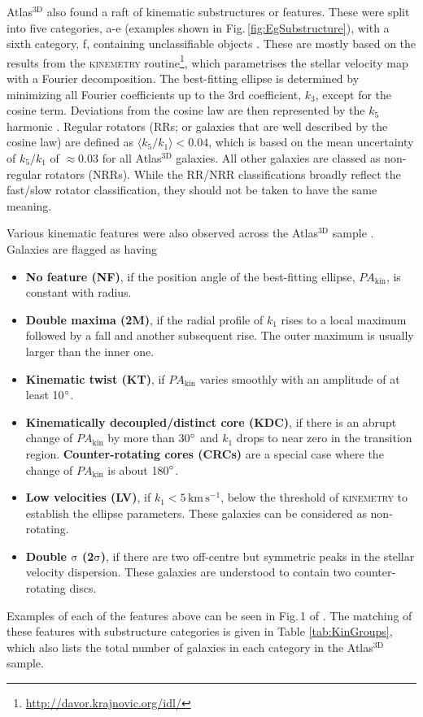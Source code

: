 	Atlas$^\text{3D}$ also found a raft of kinematic substructures or features. These were split into five categories, a-e (examples shown in Fig.\,\ref{fig:EgSubstructure}), with a sixth category, f, containing unclassifiable objects \citep{Krajnovic2011}. These are mostly based on the results from the \textsc{kinemetry} routine\footnote{\url{http://davor.krajnovic.org/idl/}}\citep{Krajnovic2006}, which parametrises the stellar velocity map with a Fourier decomposition. The best-fitting ellipse is determined by minimizing all Fourier coefficients up to the 3rd coefficient, $k_3$, except for the cosine term. Deviations from the cosine law are then represented by the $k_5$ harmonic \citep{Krajnovic2006}. Regular rotators (RRs; or galaxies that are well described by the cosine law) are defined as $\langle k_5/k_1 \rangle < 0.04$, which is based on the mean uncertainty of $k_5/k_1$ of $\approx 0.03$ for all Atlas$^\text{3D}$ galaxies. All other galaxies are classed as non-regular rotators (NRRs). While the RR/NRR classifications broadly reflect the fast/slow rotator classification, they should not be taken to have the same meaning. 

	Various kinematic features were also observed across the Atlas$^\text{3D}$ sample \citep{Krajnovic2011}. Galaxies are flagged as having
	\begin{itemize}
		\item \textbf{No feature (NF)}, if the position angle of the best-fitting ellipse, $PA_\mathrm{kin}$, is constant with radius.
		\item \textbf{Double maxima (2M)}, if the radial profile of $k_1$ rises to a local maximum followed by a fall and another subsequent rise. The outer maximum is usually larger than the inner one. 
		\item \textbf{Kinematic twist (KT)}, if $PA_\mathrm{kin}$ varies smoothly with an amplitude of at least 10$\degree$. 
		\item \textbf{Kinematically decoupled/distinct core (KDC)}, if there is an abrupt change of $PA_\mathrm{kin}$ by more than 30$\degree$ and $k_1$ drops to near zero in the transition region. \textbf{Counter-rotating cores (CRCs)} are a special case where the change of $PA_\mathrm{kin}$ is about 180$\degree$.
		\item \textbf{Low velocities (LV)}, if $k_1 < 5 \, \mathrm{km \, s^{-1}}$, below the threshold of \textsc{kinemetry} to establish the ellipse parameters. These galaxies can be considered as non-rotating.
		\item \textbf{Double $\mathrm{\sigma}$ (2$\mathrm{\sigma}$)}, if there are two off-centre but symmetric peaks in the stellar velocity dispersion. These galaxies are understood to contain two counter-rotating discs. 
	\end{itemize}
	Examples of each of the features above can be seen in Fig.\,1 of \citet{Krajnovic2011}. The matching of these features with substructure categories is given in Table \ref{tab:KinGroups}, which also lists the total number of galaxies in each category in the Atlas$^\text{3D}$ sample. 

